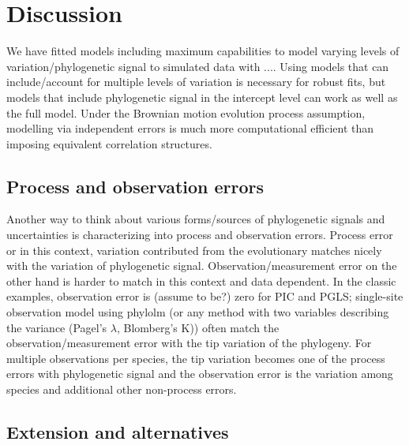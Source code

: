 
\newpage

\section{Discussion}

We have fitted models including maximum capabilities to model varying levels of variation/phylogenetic signal to simulated data with ....
Using models that can include/account for multiple levels of variation is necessary for robust fits, but models that include phylogenetic signal in the intercept level can work as well as the full model.
Under the Brownian motion evolution process assumption, modelling via independent errors is much more computational efficient than imposing equivalent correlation structures.

\subsection{Process and observation errors}

Another way to think about various forms/sources of phylogenetic signals and uncertainties is characterizing into process and observation errors.
Process error or in this context, variation contributed from the evolutionary matches nicely with the variation of phylogenetic signal. 
Observation/measurement error on the other hand is harder to match in this context and data dependent.
In the classic examples, observation error is (assume to be?) zero for PIC and PGLS; single-site observation model using phylolm (or any method with two variables describing the variance (Pagel's $\lambda$, Blomberg's K)) often match the observation/measurement error with the tip variation of the phylogeny.
For multiple observations per species, the tip variation becomes one of the process errors with phylogenetic signal and the observation error is the variation among species and additional other non-process errors.

\subsection{Extension and alternatives}

